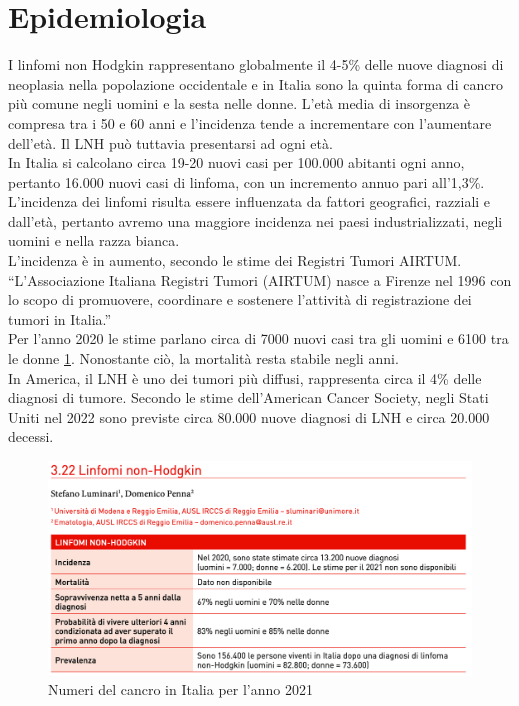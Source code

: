 \section{Epidemiologia}
I linfomi non Hodgkin rappresentano globalmente il 4-5\% delle nuove diagnosi di neoplasia nella popolazione 
occidentale e in Italia 
sono la quinta forma di cancro più comune negli uomini e la sesta nelle donne\cite{AIOM}. 
L’età media di insorgenza è compresa tra i 50 e 60 anni e l’incidenza tende a incrementare con l’aumentare dell’età. 
Il LNH può tuttavia presentarsi ad ogni età.\\ 
In Italia si calcolano circa 19-20 nuovi casi per 100.000 abitanti ogni anno, pertanto 16.000 nuovi casi di linfoma, 
con un incremento annuo pari all’1,3\%\cite{AIOM}.\\
L’incidenza dei linfomi risulta essere influenzata da fattori geografici, razziali e dall'età, 
pertanto avremo una maggiore incidenza nei paesi industrializzati, negli uomini e nella razza bianca\cite{AIOM}.\\
L’incidenza è in aumento, secondo le stime dei Registri Tumori AIRTUM. “L’Associazione Italiana Registri Tumori 
(AIRTUM) nasce a Firenze nel 1996 con lo scopo di promuovere, coordinare e sostenere l’attività di registrazione 
dei tumori in Italia\cite{AIRTUM}.”\\
Per l’anno 2020 le stime parlano circa di 7000 nuovi casi tra gli uomini e 6100 tra le donne \ref*{fig:FIGURE_2.2}. 
Nonostante ciò, la mortalità resta stabile negli anni\cite{AIRC}.\\
In America, il LNH è uno dei tumori più diffusi, rappresenta circa il 4\% delle diagnosi di tumore. 
Secondo le stime dell’American Cancer Society, negli Stati Uniti nel 2022 sono previste circa 80.000 nuove 
diagnosi di LNH e circa 20.000 decessi\cite{Americanstatistic}.\\

\begin{figure}[H]
    \begin{center}
    \includegraphics[width=0.8\columnwidth]{img/2021.png}
    \end{center}
    \caption[Numeri del cancro in Italia per l’anno 2021]{Numeri del cancro in Italia per l’anno 2021
    \cite{img4}}
    \label{fig:FIGURE_2.2}
\end{figure}

